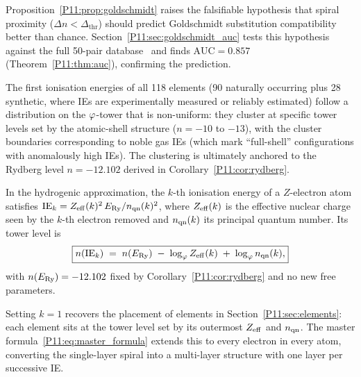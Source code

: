 \begin{remark}
\label{P11:rem:predictive_power_confirmed}
Proposition~\ref{P11:prop:goldschmidt} raises the falsifiable hypothesis that
spiral proximity ($\Delta n < \Delta_\mathrm{thr}$) should predict
Goldschmidt substitution compatibility better than chance.
Section~\ref{P11:sec:goldschmidt_auc} tests this hypothesis against the full
50-pair database~\cite{Goldschmidt1937,Burns1967} and finds
$\mathrm{AUC} = 0.857$ (Theorem~\ref{P11:thm:auc}), confirming the prediction.
\end{remark}

\begin{conjecture}
\label{P11:conj:spiral_pt}
The first ionisation energies of all 118 elements (90 naturally occurring
plus 28 synthetic, where IEs are experimentally measured or reliably estimated)
follow a distribution on the $\varphi$-tower that is non-uniform:
they cluster at specific tower levels set by the
atomic-shell structure ($n=-10$ to $-13$), with the cluster
boundaries corresponding to noble gas IEs (which mark
``full-shell'' configurations with anomalously high IEs).
The clustering is ultimately anchored to the Rydberg level
$n = -12.102$ derived in Corollary~\ref{P11:cor:rydberg}.
\end{conjecture}

\begin{proposition}
\label{P11:prop:master_formula}
In the hydrogenic approximation, the $k$-th ionisation energy of a
$Z$-electron atom satisfies
$\mathrm{IE}_k = Z_{\rm eff}(k)^2\,E_{\mathrm{Ry}}/n_{\rm qn}(k)^2$,
where $Z_{\rm eff}(k)$ is the effective nuclear charge seen by the
$k$-th electron removed and $n_{\rm qn}(k)$ its principal quantum
number.  Its tower level is
\begin{equation}
  \boxed{
    n\!\left(\mathrm{IE}_k\right)
    \;=\; n\!\left(E_{\mathrm{Ry}}\right)
          \;-\; \log_\varphi Z_{\rm eff}(k)
          \;+\; \log_\varphi n_{\rm qn}(k),
  }
  \label{P11:eq:master_formula}
\end{equation}
with $n\!\left(E_{\mathrm{Ry}}\right)=-12.102$ fixed by Corollary~\ref{P11:cor:rydberg}
and no new free parameters.
\end{proposition}

\begin{remark}[The first-IE layer as the $k=1$ case]
\label{P11:rem:first_IE_special}
Setting $k=1$ recovers the placement of elements in
Section~\ref{P11:sec:elements}: each element sits at the tower level
set by its outermost $Z_{\rm eff}$ and $n_{\rm qn}$.
The master formula~\eqref{P11:eq:master_formula} extends this to
every electron in every atom, converting the single-layer spiral into
a multi-layer structure with one layer per successive IE.
\end{remark}

